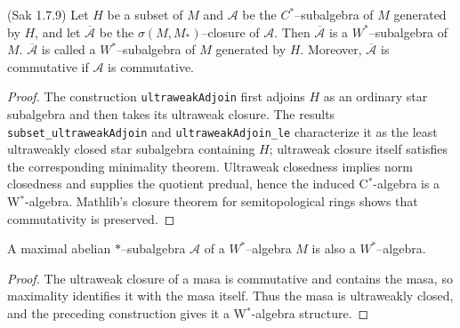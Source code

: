\begin{corollary}
  \label{cor:sig_clos_of_cstar_is_wstar_Sak_1_7_9} (Sak 1.7.9)
  \leanok
  Let $H$ be a subset of $M$ and $\mathcal{A}$ be the $C^{*}$--subalgebra of $M$ generated
  by $H$, and let $\overline{\mathcal{A}}$ be the $\sigma(M,M_{*})$--closure of $\mathcal{A}$. Then
  $\overline{\mathcal{A}}$ is a $W^{*}$--subalgebra of $M$. $\overline{\mathcal{A}}$ is called a $W^{*}$--subalgebra
  of $M$ generated by $H$. Moreover, $\overline{\mathcal{A}}$ is commutative if $\mathcal{A}$ is commutative.
\end{corollary}

\begin{proof}
  \leanok
  The construction \texttt{ultraweakAdjoin} first adjoins $H$ as an ordinary star subalgebra and
  then takes its ultraweak closure. The results \texttt{subset\_ultraweakAdjoin} and
  \texttt{ultraweakAdjoin\_le} characterize it as the least ultraweakly closed star subalgebra
  containing $H$; ultraweak closure itself satisfies the corresponding minimality theorem.
  Ultraweak closedness implies norm closedness and supplies the quotient predual, hence the
  induced C$^*$-algebra is a W$^*$-algebra. Mathlib's closure theorem for semitopological rings
  shows that commutativity is preserved.
\end{proof}

\begin{lemma}
  \label{lem:wstar_of_masa}
  \leanok
  A maximal abelian $*$--subalgebra $\mathcal{A}$ of a $W^{*}$--algebra $M$ is also a $W^{*}$--algebra.
\end{lemma}

\begin{proof}
  \leanok
  The ultraweak closure of a masa is commutative and contains the masa, so maximality identifies
  it with the masa itself. Thus the masa is ultraweakly closed, and the preceding construction
  gives it a W$^*$-algebra structure.
\end{proof}

